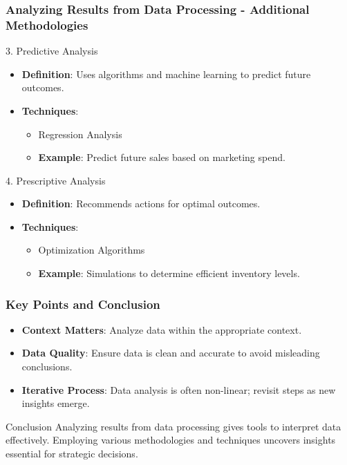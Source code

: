 \documentclass[aspectratio=169]{beamer}
\begin{document}
\begin{frame}[fragile]
    \frametitle{Analyzing Results from Data Processing - Additional Methodologies}
    \begin{block}{3. Predictive Analysis}
        \begin{itemize}
            \item \textbf{Definition}: Uses algorithms and machine learning to predict future outcomes.
            \item \textbf{Techniques}: 
                \begin{itemize}
                    \item Regression Analysis
                    \item \textbf{Example}: Predict future sales based on marketing spend.
                \end{itemize}
        \end{itemize}
    \end{block}

    \begin{block}{4. Prescriptive Analysis}
        \begin{itemize}
            \item \textbf{Definition}: Recommends actions for optimal outcomes.
            \item \textbf{Techniques}:
                \begin{itemize}
                    \item Optimization Algorithms
                    \item \textbf{Example}: Simulations to determine efficient inventory levels.
                \end{itemize}
        \end{itemize}
    \end{block}
\end{frame}

\begin{frame}[fragile]
    \frametitle{Key Points and Conclusion}
    \begin{itemize}
        \item \textbf{Context Matters}: Analyze data within the appropriate context.
        \item \textbf{Data Quality}: Ensure data is clean and accurate to avoid misleading conclusions.
        \item \textbf{Iterative Process}: Data analysis is often non-linear; revisit steps as new insights emerge.
    \end{itemize}

    \begin{block}{Conclusion}
        Analyzing results from data processing gives tools to interpret data effectively. Employing various methodologies and techniques uncovers insights essential for strategic decisions.
    \end{block}
\end{frame}
\end{document}
